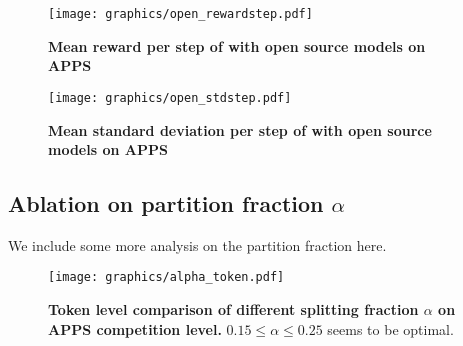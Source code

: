\begin{figure}[ht]
    \centering
    \texttt{[image: graphics/open\_rewardstep.pdf]}
    \caption{\textbf{Mean reward per step of \decomp with open source models on APPS}}
    \label{fig:open_rewardstep}
\end{figure}

\begin{figure}[ht]
    \centering
    \texttt{[image: graphics/open\_stdstep.pdf]}
    \caption{\textbf{Mean standard deviation per step of \decomp with open source models on APPS}}
    \label{fig:open_stdstep}
\end{figure}


\newpage
\subsection{Ablation on partition fraction $\alpha$}
\label{sec:ab_alphafraction}
We include some more analysis on the partition fraction here. 

\begin{figure}[ht]
    \centering
    \texttt{[image: graphics/alpha\_token.pdf]}
    \caption{\textbf{Token level comparison of different \decomp splitting fraction $\alpha$ on APPS competition level.} $0.15 \le \alpha \le 0.25$ seems to be optimal.}
    \label{fig:alpha_token}
\end{figure}